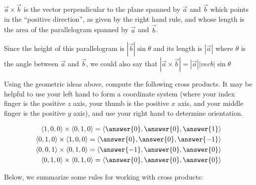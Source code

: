 \documentclass{ximera}
\begin{document}
\begin{theorem}
	$\vec{a} \times \vec{b}$ is the vector perpendicular to the plane spanned by $\vec{a}$ and $\vec{b}$ which points in the ``positive direction'', as given by the right hand rule, and whose length is the area of the parallelogram spanned by $\vec{a}$ and $\vec{b}$.  
\end{theorem}

\begin{observation}
Since the height of this parallelogram is $|\vec{b}| \sin\theta$ and its length is $|\vec{a}|$ where $\theta$ is the angle between $\vec{a}$ and $\vec{b}$, we could also say that $|\vec{a} \times \vec{b}| = |\vec{a}||vec{b}| \sin\theta$
\end{observation}

\begin{question}
	Using the geometric ideas above, compute the following cross products.  It may be helpful to use  your left hand to form a coordinate system (where your index finger is the positive $z$ axis, your thumb is the positive $x$ axis, and your middle finger is the positive $y$ axis), and use your right hand to determine orientation.
	
	\begin{align*}
		\vector{1,0,0} \times \vector{0,1,0} = \vector{\answer{0},\answer{0},\answer{1}}\\
		\vector{0,1,0} \times \vector{1,0,0} = \vector{\answer{0},\answer{0},\answer{-1}}\\
		\vector{0,0,1} \times \vector{0,1,0} = \vector{\answer{-1},\answer{0},\answer{0}}\\
		\vector{0,1,0} \times \vector{0,1,0} = \vector{\answer{0},\answer{0},\answer{0}}\\
	\end{align*}
\end{question}

Below, we summarize some rules for working with cross products:
\end{document}
